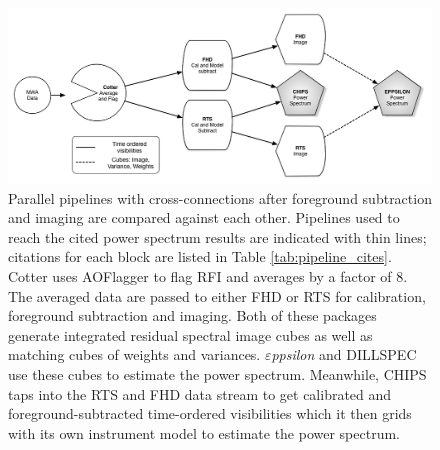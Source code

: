 \documentclass[preprint2]{aastex}
\def\eppsilon{{\it $\varepsilon$ppsilon}}
\def\empirical{DILLSPEC}
\begin{document}

\begin{figure}[htbp]
\begin{center}
\includegraphics[width=\textwidth]{figures/MWA_Pipes.png}
\caption{Parallel pipelines with cross-connections after foreground subtraction and imaging are compared against each other. Pipelines used to reach the cited power spectrum results are indicated with thin lines; citations for each block are listed in Table \ref{tab:pipeline_cites}. Cotter uses AOFlagger to flag RFI and averages by a factor of 8. The averaged data are passed to either FHD or RTS for calibration, foreground subtraction and imaging. Both of these packages generate integrated residual spectral image cubes as well as matching cubes of weights and variances.  \eppsilon{} and \empirical{} use these cubes to estimate the power spectrum. Meanwhile, CHIPS taps into the RTS and FHD data stream to get calibrated and foreground-subtracted time-ordered  visibilities which it then grids with its own instrument model to estimate the power spectrum. 
}
\label{fig:pipes}
\end{center}
\end{figure}
\end{document}
